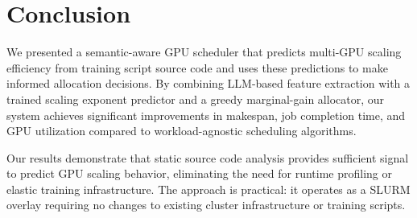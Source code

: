 \documentclass[letterpaper,10pt]{article}
\begin{document}
\section{Conclusion}
\label{sec:conclusion}

We presented a semantic-aware GPU scheduler that predicts multi-GPU scaling efficiency from training script source code and uses these predictions to make informed allocation decisions. By combining LLM-based feature extraction with a trained scaling exponent predictor and a greedy marginal-gain allocator, our system achieves significant improvements in makespan, job completion time, and GPU utilization compared to workload-agnostic scheduling algorithms.

Our results demonstrate that static source code analysis provides sufficient signal to predict GPU scaling behavior, eliminating the need for runtime profiling or elastic training infrastructure. The approach is practical: it operates as a SLURM overlay requiring no changes to existing cluster infrastructure or training scripts.
\end{document}
